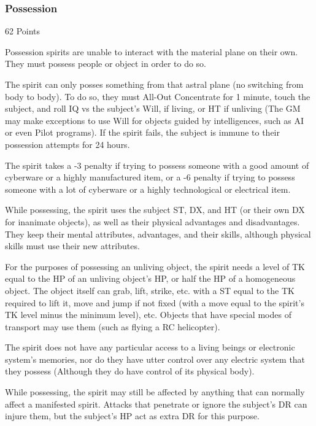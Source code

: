 \begin{multicols*}{3}
	\subsubsection*{Possession}
	\begin{flushright}
		62 Points
	\end{flushright}
	
	Possession spirits are unable to interact with the material plane on their own. They must possess people or object in order to do so.
	
	The spirit can only posses something from that astral plane (no switching from body to body). To do so, they must All-Out Concentrate for 1 minute, touch the subject, and roll IQ vs the subject's Will, if living, or HT if unliving (The GM may make exceptions to use Will for objects guided by intelligences, such as AI or even Pilot programs). If the spirit fails, the subject is immune to their possession attempts for 24 hours.
	
	The spirit takes a -3 penalty if trying to possess someone with a good amount of cyberware or a highly manufactured item, or a -6 penalty if trying to possess someone with a lot of cyberware or a highly technological or electrical item.
	
	While possessing, the spirit uses the subject ST, DX, and HT (or their own DX for inanimate objects), as well as their physical advantages and disadvantages. They keep their mental attributes, advantages, and their skills, although physical skills must use their new attributes.
	
	For the purposes of possessing an unliving object, the spirit needs a level of TK equal to the HP of an unliving object's HP, or half the HP of a homogeneous object. The object itself can grab, lift, strike, etc. with a ST equal to the TK required to lift it, move and jump if not fixed (with a move equal to the spirit's TK level minus the minimum level), etc. Objects that have special modes of transport may use them (such as flying a RC helicopter).
	
	The spirit does not have any particular access to a living beings or electronic system's memories, nor do they have utter control over any electric system that they possess (Although they do have control of its physical body).
	
	While possessing, the spirit may still be affected by anything that can normally affect a manifested spirit. Attacks that penetrate or ignore the subject’s DR can injure them, but the subject's HP act as extra DR for this purpose. 
	

\end{multicols*}
